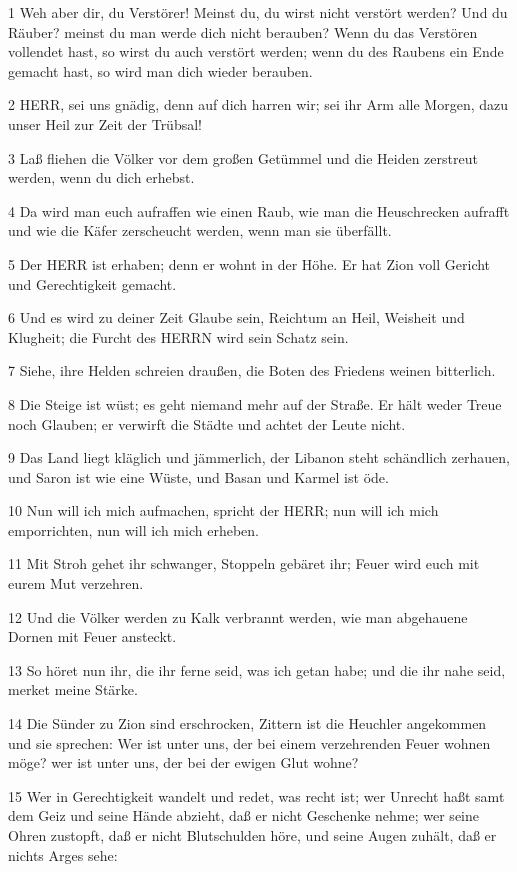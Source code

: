 \par 1 Weh aber dir, du Verstörer! Meinst du, du wirst nicht verstört werden? Und du Räuber? meinst du man werde dich nicht berauben? Wenn du das Verstören vollendet hast, so wirst du auch verstört werden; wenn du des Raubens ein Ende gemacht hast, so wird man dich wieder berauben.
\par 2 HERR, sei uns gnädig, denn auf dich harren wir; sei ihr Arm alle Morgen, dazu unser Heil zur Zeit der Trübsal!
\par 3 Laß fliehen die Völker vor dem großen Getümmel und die Heiden zerstreut werden, wenn du dich erhebst.
\par 4 Da wird man euch aufraffen wie einen Raub, wie man die Heuschrecken aufrafft und wie die Käfer zerscheucht werden, wenn man sie überfällt.
\par 5 Der HERR ist erhaben; denn er wohnt in der Höhe. Er hat Zion voll Gericht und Gerechtigkeit gemacht.
\par 6 Und es wird zu deiner Zeit Glaube sein, Reichtum an Heil, Weisheit und Klugheit; die Furcht des HERRN wird sein Schatz sein.
\par 7 Siehe, ihre Helden schreien draußen, die Boten des Friedens weinen bitterlich.
\par 8 Die Steige ist wüst; es geht niemand mehr auf der Straße. Er hält weder Treue noch Glauben; er verwirft die Städte und achtet der Leute nicht.
\par 9 Das Land liegt kläglich und jämmerlich, der Libanon steht schändlich zerhauen, und Saron ist wie eine Wüste, und Basan und Karmel ist öde.
\par 10 Nun will ich mich aufmachen, spricht der HERR; nun will ich mich emporrichten, nun will ich mich erheben.
\par 11 Mit Stroh gehet ihr schwanger, Stoppeln gebäret ihr; Feuer wird euch mit eurem Mut verzehren.
\par 12 Und die Völker werden zu Kalk verbrannt werden, wie man abgehauene Dornen mit Feuer ansteckt.
\par 13 So höret nun ihr, die ihr ferne seid, was ich getan habe; und die ihr nahe seid, merket meine Stärke.
\par 14 Die Sünder zu Zion sind erschrocken, Zittern ist die Heuchler angekommen und sie sprechen: Wer ist unter uns, der bei einem verzehrenden Feuer wohnen möge? wer ist unter uns, der bei der ewigen Glut wohne?
\par 15 Wer in Gerechtigkeit wandelt und redet, was recht ist; wer Unrecht haßt samt dem Geiz und seine Hände abzieht, daß er nicht Geschenke nehme; wer seine Ohren zustopft, daß er nicht Blutschulden höre, und seine Augen zuhält, daß er nichts Arges sehe:
